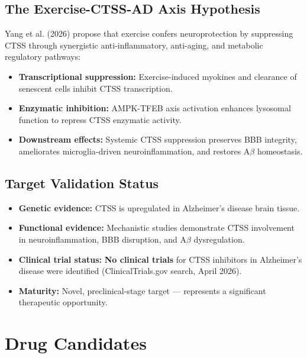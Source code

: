 \documentclass[11pt, a4paper]{article}
\begin{document}
\subsection{The Exercise-CTSS-AD Axis Hypothesis}

Yang et al. (2026) propose that exercise confers neuroprotection by suppressing CTSS through synergistic anti-inflammatory, anti-aging, and metabolic regulatory pathways:

\begin{itemize}
    \item \textbf{Transcriptional suppression:} Exercise-induced myokines and clearance of senescent cells inhibit CTSS transcription.
    \item \textbf{Enzymatic inhibition:} AMPK-TFEB axis activation enhances lysosomal function to repress CTSS enzymatic activity.
    \item \textbf{Downstream effects:} Systemic CTSS suppression preserves BBB integrity, ameliorates microglia-driven neuroinflammation, and restores A$\beta$ homeostasis.
\end{itemize}

\subsection{Target Validation Status}

\begin{itemize}
    \item \textbf{Genetic evidence:} CTSS is upregulated in Alzheimer's disease brain tissue.
    \item \textbf{Functional evidence:} Mechanistic studies demonstrate CTSS involvement in neuroinflammation, BBB disruption, and A$\beta$ dysregulation.
    \item \textbf{Clinical trial status:} \textbf{No clinical trials} for CTSS inhibitors in Alzheimer's disease were identified (ClinicalTrials.gov search, April 2026).
    \item \textbf{Maturity:} Novel, preclinical-stage target — represents a significant therapeutic opportunity.
\end{itemize}

\section{Drug Candidates}
\end{document}
